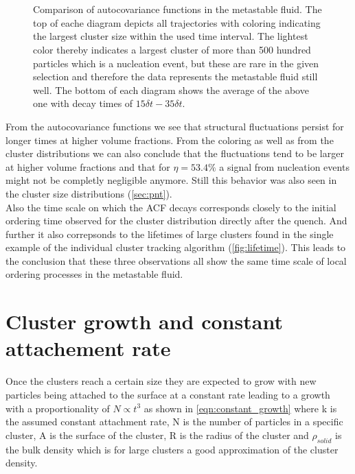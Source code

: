 \begin{figure}[ht]
\begin{center}
 \hspace{0.5cm}
 \\
 \hspace{0.5cm}
 \\
\caption[Autocovariance functions of largest cluster in the metastable fluid]{Comparison of autocovariance functions in the metastable fluid. The top of eache diagram depicts all trajectories with coloring indicating the largest cluster size within the used time interval. The lightest color thereby indicates a largest cluster of more than 500 hundred particles which is a nucleation event, but these are rare in the given selection and therefore the data represents the metastable fluid still well. The bottom of each diagram shows the average of the above one with decay times of $ 15 \delta t- 35 \delta t$. }
\label{fig:acf}
\end{center}
\end{figure}

From the autocovariance functions we see that structural fluctuations persist for longer times at higher volume fractions. From the coloring as well as from the cluster distributions we can also conclude that the fluctuations tend to be larger at higher volume fractions and that for $\eta=53.4\%$ a signal from nucleation events might not be completly negligible anymore. Still this behavior was also seen in the cluster size distributions (\autoref{sec:pnt}).\\
Also the time scale on which the ACF decays corresponds closely to the initial ordering time observed for the cluster distribution directly after the quench. And further it also correpsonds to the lifetimes of large clusters found in the single example of the individual cluster tracking algorithm (\autoref{fig:lifetime}). This leads to the conclusion that these three observations all show the same time scale of local ordering processes in the metastable fluid. 

\section{Cluster growth and constant attachement rate}
\label{sec:cluster_growth}
Once the clusters reach a certain size they are expected to grow with new particles being attached to the surface at a constant rate leading to a growth with a proportionality of $N \propto t^3$ as shown in \autoref{eqn:constant_growth} where k is the assumed constant attachment rate, N is the number of particles in a specific cluster, A is the surface of the cluster, R is the radius of the cluster and $\rho_{solid}$ is the bulk density which is for large clusters a good approximation of the cluster density.\\

